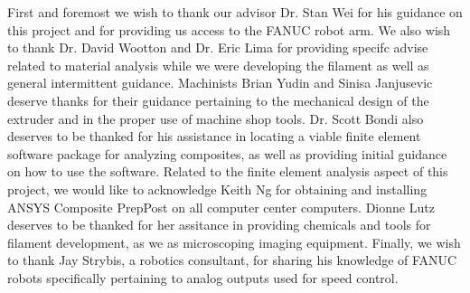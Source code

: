 
First and foremost we wish to thank our advisor Dr. Stan Wei for his guidance on this project and for providing us access to the FANUC robot arm. We also wish to thank Dr. David Wootton and Dr. Eric Lima for providing specifc advise related to material analysis while we were developing the filament as well as general intermittent guidance. Machinists Brian Yudin and Sinisa Janjusevic deserve thanks for their guidance pertaining to the mechanical design of the extruder and in the proper use of machine shop tools. Dr. Scott Bondi also deserves to be thanked for his assistance in locating a viable finite element software package for analyzing composites, as well as providing initial guidance on how to use the software. Related to the finite element analysis aspect of this project, we would like to acknowledge Keith Ng for obtaining and installing ANSYS Composite PrepPost on all computer center computers. Dionne Lutz deserves to be thanked for her assitance in providing chemicals and tools for filament development, as we as microscoping imaging equipment. Finally, we wish to thank Jay Strybis, a robotics consultant, for sharing his knowledge of FANUC robots specifically pertaining to analog outputs used for speed control.